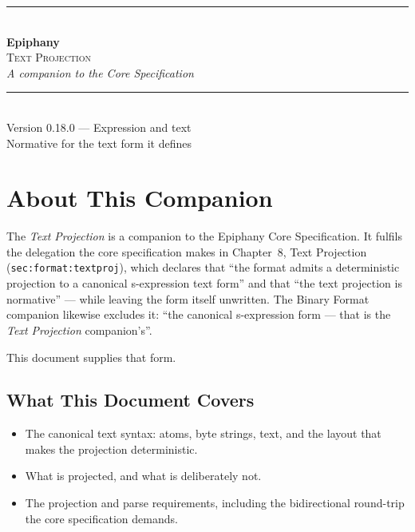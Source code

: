 \documentclass[11pt,letterpaper]{report}
\newcommand{\sectionsc}[1]{{\addfontfeatures{Letters=SmallCaps}#1}}
\newcounter{requirement}[chapter]
\begin{document}
\begin{titlepage}
  \thispagestyle{empty}
  \centering
  \vspace*{2.2in}
  {\color{epiphanygold}\rule{3in}{0.8pt}}\\[18pt]
  {\titlefont\fontsize{34pt}{38pt}\selectfont\color{epiphanyteal}\bfseries Epiphany}\\[10pt]
  {\Large\scshape\color{epiphanyslate}Text Projection}\\[6pt]
  {\large\itshape\color{epiphanyslate}A companion to the Core Specification}\\[14pt]
  {\color{epiphanygold}\rule{3in}{0.8pt}}\\[24pt]
  {\normalsize\color{epiphanyink}Version 0.18.0 --- Expression and text}\\[4pt]
  {\small\color{epiphanyslate}Normative for the text form it defines}
  \vfill
\end{titlepage}

\tableofcontents

\chapter{About This Companion}
\label{ch:about}

The \emph{Text Projection} is a companion to the Epiphany Core Specification. It
fulfils the delegation the core specification makes in Chapter~8,
\sectionsc{Text Projection} (\texttt{sec:format:textproj}), which declares that
``the format admits a deterministic projection to a canonical s-expression text
form'' and that ``the text projection is normative'' --- while leaving the form
itself unwritten. The Binary Format companion likewise excludes it: ``the
canonical s-expression form --- that is the \emph{Text Projection} companion's''.

This document supplies that form.

\section{What This Document Covers}

\begin{itemize}
  \item The canonical text syntax: atoms, byte strings, text, and the layout that
    makes the projection deterministic.
  \item What is projected, and what is deliberately not.
  \item The projection and parse requirements, including the bidirectional
    round-trip the core specification demands.
\end{itemize}
\end{document}
